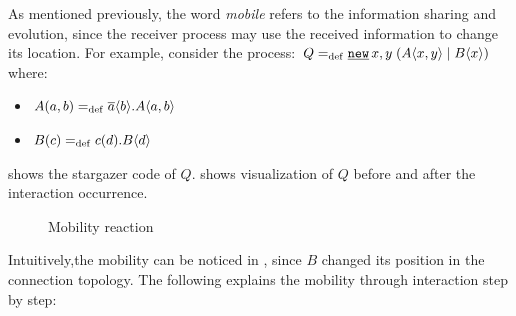 As mentioned previously, the word \textit{mobile} refers to the information sharing and evolution, since the receiver process may use the received information to change its location. For example, consider the process: $Q\define\procres{x,y}{(\procpar{\proccall{A}{x,y}}{\proccall{B}{x}})}$ where:
\begin{itemize}
\item $A(a,b)=_{\mathrm{def}}{}\overline{a}\langle{b}\rangle.A\langle a,b\rangle$
\item $B(c)=_{\mathrm{def}}{}c({d}).B\langle d\rangle$
\end{itemize}


 shows the stargazer code of $Q$.   shows visualization of $Q$ before and after the interaction occurrence.

\raggedbottom
\begin{figure}[H]%
\centering
{}%
\hfill
{}%
\caption{Mobility reaction}
\label{pi_mobility_stargazer_react}%
\end{figure}
Intuitively,the mobility can be noticed in , since $B$ changed its position in the connection topology.
The following explains the mobility through interaction step by step:

